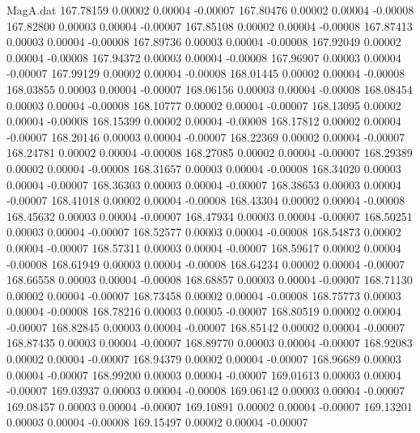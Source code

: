 \begin{filecontents}{MagA.dat}
 167.78159    0.00002    0.00004   -0.00007
 167.80476    0.00002    0.00004   -0.00008
 167.82800    0.00003    0.00004   -0.00007
 167.85108    0.00002    0.00004   -0.00008
 167.87413    0.00003    0.00004   -0.00008
 167.89736    0.00003    0.00004   -0.00008
 167.92049    0.00002    0.00004   -0.00008
 167.94372    0.00003    0.00004   -0.00008
 167.96907    0.00003    0.00004   -0.00007
 167.99129    0.00002    0.00004   -0.00008
 168.01445    0.00002    0.00004   -0.00008
 168.03855    0.00003    0.00004   -0.00007
 168.06156    0.00003    0.00004   -0.00008
 168.08454    0.00003    0.00004   -0.00008
 168.10777    0.00002    0.00004   -0.00007
 168.13095    0.00002    0.00004   -0.00008
 168.15399    0.00002    0.00004   -0.00008
 168.17812    0.00002    0.00004   -0.00007
 168.20146    0.00003    0.00004   -0.00007
 168.22369    0.00002    0.00004   -0.00007
 168.24781    0.00002    0.00004   -0.00008
 168.27085    0.00002    0.00004   -0.00007
 168.29389    0.00002    0.00004   -0.00008
 168.31657    0.00003    0.00004   -0.00008
 168.34020    0.00003    0.00004   -0.00007
 168.36303    0.00003    0.00004   -0.00007
 168.38653    0.00003    0.00004   -0.00007
 168.41018    0.00002    0.00004   -0.00008
 168.43304    0.00002    0.00004   -0.00008
 168.45632    0.00003    0.00004   -0.00007
 168.47934    0.00003    0.00004   -0.00007
 168.50251    0.00003    0.00004   -0.00007
 168.52577    0.00003    0.00004   -0.00008
 168.54873    0.00002    0.00004   -0.00007
 168.57311    0.00003    0.00004   -0.00007
 168.59617    0.00002    0.00004   -0.00008
 168.61949    0.00003    0.00004   -0.00008
 168.64234    0.00002    0.00004   -0.00007
 168.66558    0.00003    0.00004   -0.00008
 168.68857    0.00003    0.00004   -0.00007
 168.71130    0.00002    0.00004   -0.00007
 168.73458    0.00002    0.00004   -0.00008
 168.75773    0.00003    0.00004   -0.00008
 168.78216    0.00003    0.00005   -0.00007
 168.80519    0.00002    0.00004   -0.00007
 168.82845    0.00003    0.00004   -0.00007
 168.85142    0.00002    0.00004   -0.00007
 168.87435    0.00003    0.00004   -0.00007
 168.89770    0.00003    0.00004   -0.00007
 168.92083    0.00002    0.00004   -0.00007
 168.94379    0.00002    0.00004   -0.00007
 168.96689    0.00003    0.00004   -0.00007
 168.99200    0.00003    0.00004   -0.00007
 169.01613    0.00003    0.00004   -0.00007
 169.03937    0.00003    0.00004   -0.00008
 169.06142    0.00003    0.00004   -0.00007
 169.08457    0.00003    0.00004   -0.00007
 169.10891    0.00002    0.00004   -0.00007
 169.13201    0.00003    0.00004   -0.00008
 169.15497    0.00002    0.00004   -0.00007

\end{filecontents}
